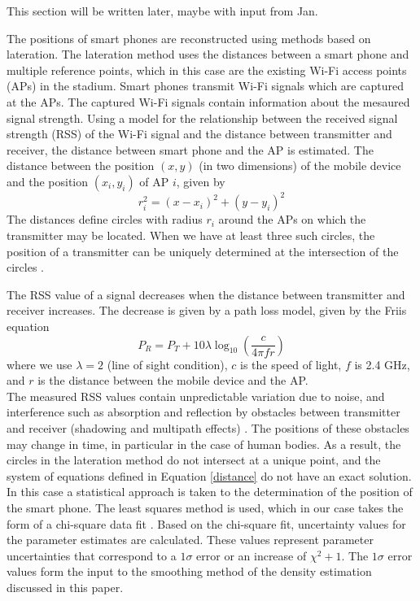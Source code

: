 \documentclass[10pt,a4paper]{article}
\begin{document}
This section will be written later, maybe with input from Jan. 

The positions of smart phones are reconstructed using methods based on lateration. 
The lateration method uses the distances between a smart phone and multiple reference points, which in this case are the existing Wi-Fi access points (APs) in the stadium.
Smart phones transmit Wi-Fi signals which are captured at the APs.
The captured Wi-Fi signals contain information about the mesaured signal strength.
Using a model for the relationship between the received signal strength (RSS) of the Wi-Fi signal and the distance between transmitter and receiver, the distance between smart phone and the AP is estimated.
The distance between the position $(x,y)$ (in two dimensions) of the mobile device and the position $(x_{i},y_{i})$ of AP $i$, given by 
\begin{equation}
r_{i}^2=(x-x_{i})^2+(y-y_{i})^2
\label{distance}
\end{equation}
The distances define circles with radius $r_{i}$ around the APs on which the transmitter may be located.
When we have at least three such circles, the position of a transmitter can be uniquely determined at the intersection of the circles \cite{kushki:1}.

The RSS value of a signal decreases when the distance between transmitter and receiver increases.
The decrease is given by a path loss model, given by the Friis equation
\begin{equation}
P_{R}=P_{T}+10\lambda\log_{10}(\frac{c}{4\pi fr})
\label{friis}
\end{equation}
where we use $\lambda=2$ (line of sight condition), $c$ is the speed of light, $f$ is 2.4 GHz, and $r$ is the distance between the mobile device and the AP.\\
The measured RSS values contain unpredictable variation due to noise, and interference such as absorption and reflection by obstacles between transmitter and receiver (shadowing and multipath effects) \cite{goldsmith}. The positions of these obstacles may change in time, in particular in the case of human bodies.
As a result, the circles in the lateration method do not intersect at a unique point, and the system of equations defined in Equation \ref{distance} do not have an exact solution.
In this case a statistical approach is taken to the determination of the position of the smart phone.
The least squares method is used, which in our case takes the form of a chi-square data fit \cite{bevington}.
Based on the chi-square fit, uncertainty values for the parameter estimates are calculated.
These values represent parameter uncertainties that correspond to a $1\sigma$ error or an increase of $\chi^2+1$. 
The $1\sigma$ error values form the input to the smoothing method of the density estimation discussed in this paper.
\end{document}
